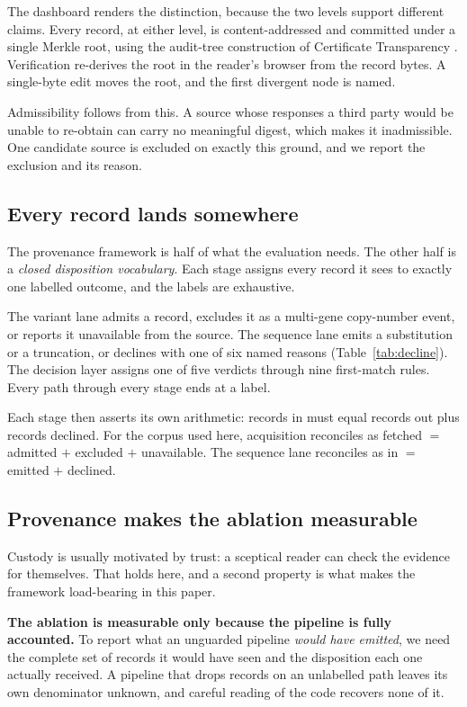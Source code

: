 The dashboard renders the distinction, because the two levels support
different claims. Every record, at either level, is content-addressed and
committed under a single Merkle root, using the audit-tree construction of
Certificate Transparency \citep{rfc6962}. Verification re-derives the root in
the reader's browser from the record bytes. A single-byte edit moves the root,
and the first divergent node is named.

Admissibility follows from this. A source whose responses a third party would
be unable to re-obtain can carry no meaningful digest, which makes it
inadmissible. One candidate source is excluded on exactly this ground, and we
report the exclusion and its reason.

\subsection{Every record lands somewhere}

The provenance framework is half of what the evaluation needs. The other half
is a \emph{closed disposition vocabulary}. Each stage assigns every record it
sees to exactly one labelled outcome, and the labels are exhaustive.

The variant lane admits a record, excludes it as a multi-gene copy-number
event, or reports it unavailable from the source. The sequence lane emits a
substitution or a truncation, or declines with one of six named reasons
(Table~\ref{tab:decline}). The decision layer assigns one of five verdicts
through nine first-match rules. Every path through every stage ends at a
label.

Each stage then asserts its own arithmetic: records in must equal records out
plus records declined. For the corpus used here, acquisition reconciles as
\CorpusFetched{} fetched $=$ \CorpusKept{} admitted $+$ \CorpusExcluded{}
excluded $+$ \CorpusUnavailable{} unavailable. The sequence lane reconciles as
\GOneProcessed{} in $=$ \GOneEmits{} emitted $+$ \SeqDeclined{} declined.

\subsection{Provenance makes the ablation measurable}

Custody is usually motivated by trust: a sceptical reader can check the
evidence for themselves. That holds here, and a second property is what makes
the framework load-bearing in this paper.

\textbf{The ablation is measurable only because the pipeline is fully
accounted.} To report what an unguarded pipeline \emph{would have emitted}, we
need the complete set of records it would have seen and the disposition each
one actually received. A pipeline that drops records on an unlabelled path
leaves its own denominator unknown, and careful reading of the code recovers
none of it.


